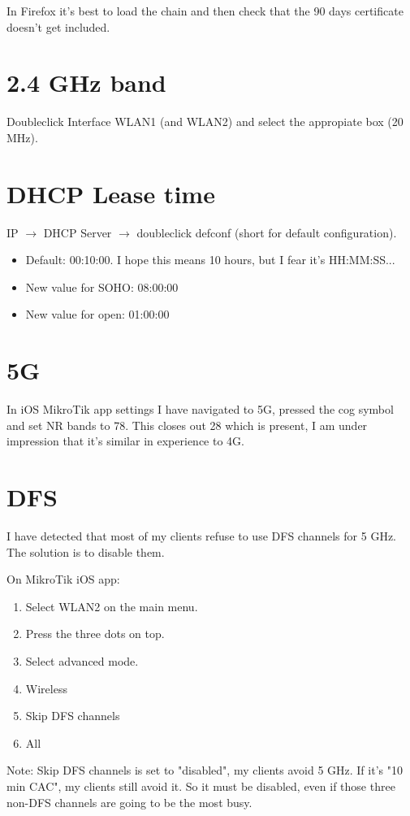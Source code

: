\documentclass[a4paper,colorlinks,linkcolor=blue]{rapport3}
\begin{document}
In Firefox it's best to load the chain and then check that the 90 days certificate doesn't get included.

\chapter{2.4 GHz band}

Doubleclick Interface WLAN1 (and WLAN2) and select the appropiate box (20 MHz).

\chapter{DHCP Lease time}

IP $\rightarrow$ DHCP Server  $\rightarrow$ doubleclick defconf (short for default configuration).

\begin{itemize}
    \item Default: 00:10:00.
     I hope this means 10 hours, but I fear it's HH:MM:SS...
    \item New value for SOHO: 08:00:00
    \item New value for open: 01:00:00
\end{itemize}

\chapter{5G}

In iOS MikroTik app settings I have navigated to 5G, pressed the cog symbol and set NR bands to 78.
This closes out 28 which is present, I am under impression that it's similar in experience to 4G.

\chapter{DFS}

I have detected that most of my clients refuse to use DFS channels for 5 GHz.
The solution is to disable them.

On MikroTik iOS app:

\begin{enumerate}
    \item Select WLAN2 on the main menu.
    \item Press the three dots on top.
    \item Select advanced mode.
    \item Wireless
    \item Skip DFS channels
    \item All
\end{enumerate}

Note: Skip DFS channels is set to "disabled", my clients avoid 5 GHz.
If it's "10 min CAC", my clients still avoid it.
So it must be disabled, even if those three non-DFS channels are going to be the most busy.
\end{document}
